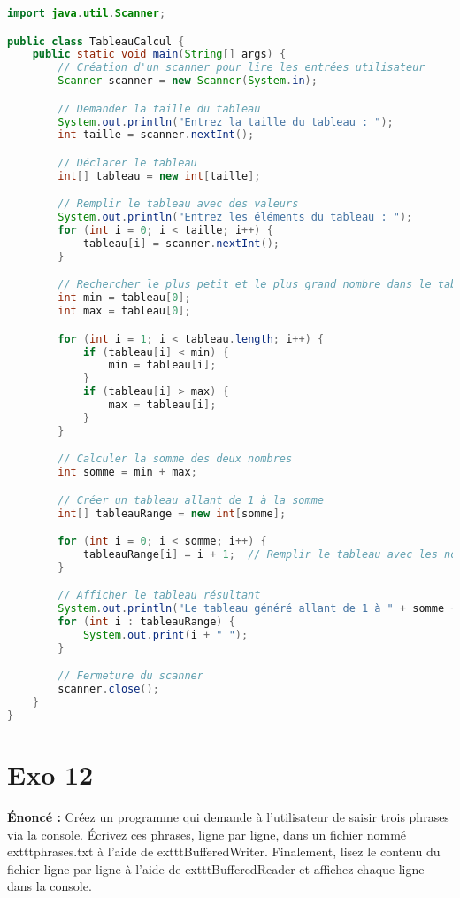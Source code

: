 \documentclass{article}
\begin{document}
\begin{lstlisting}[language=Java]
import java.util.Scanner;

public class TableauCalcul {
    public static void main(String[] args) {
        // Création d'un scanner pour lire les entrées utilisateur
        Scanner scanner = new Scanner(System.in);

        // Demander la taille du tableau
        System.out.println("Entrez la taille du tableau : ");
        int taille = scanner.nextInt();

        // Déclarer le tableau
        int[] tableau = new int[taille];

        // Remplir le tableau avec des valeurs
        System.out.println("Entrez les éléments du tableau : ");
        for (int i = 0; i < taille; i++) {
            tableau[i] = scanner.nextInt();
        }

        // Rechercher le plus petit et le plus grand nombre dans le tableau
        int min = tableau[0];
        int max = tableau[0];

        for (int i = 1; i < tableau.length; i++) {
            if (tableau[i] < min) {
                min = tableau[i];
            }
            if (tableau[i] > max) {
                max = tableau[i];
            }
        }

        // Calculer la somme des deux nombres
        int somme = min + max;

        // Créer un tableau allant de 1 à la somme
        int[] tableauRange = new int[somme];

        for (int i = 0; i < somme; i++) {
            tableauRange[i] = i + 1;  // Remplir le tableau avec les nombres de 1 à somme
        }

        // Afficher le tableau résultant
        System.out.println("Le tableau généré allant de 1 à " + somme + " est : ");
        for (int i : tableauRange) {
            System.out.print(i + " ");
        }

        // Fermeture du scanner
        scanner.close();
    }
}
\end{lstlisting}
\clearpage

\section*{Exo 12}
\noindent \textbf{Énoncé :} Créez un programme qui demande à l'utilisateur de saisir trois phrases via la console. Écrivez ces phrases, ligne par ligne, dans un fichier nommé 	exttt{phrases.txt} à l'aide de 	exttt{BufferedWriter}. Finalement, lisez le contenu du fichier ligne par ligne à l'aide de 	exttt{BufferedReader} et affichez chaque ligne dans la console.
\end{document}
